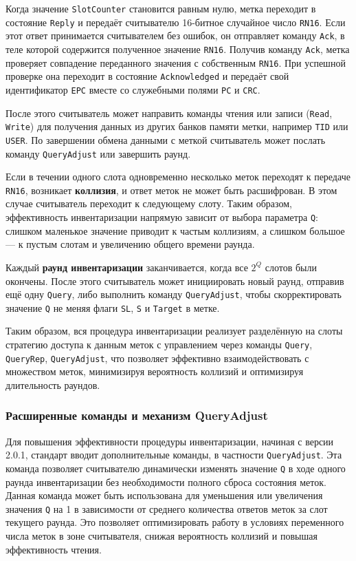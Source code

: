 \documentclass[12pt]{article}
\theoremstyle{definition}
\begin{document}
Когда значение \texttt{SlotCounter} становится равным нулю, метка переходит в состояние \texttt{Reply} и передаёт считывателю 16-битное случайное число \texttt{RN16}. Если этот ответ принимается считывателем без ошибок, он отправляет команду \texttt{Ack}, в теле которой содержится полученное значение \texttt{RN16}. Получив команду \texttt{Ack}, метка проверяет совпадение переданного значения с собственным \texttt{RN16}. При успешной проверке она переходит в состояние \texttt{Acknowledged} и передаёт свой идентификатор \texttt{EPC} вместе со служебными полями \texttt{PC} и \texttt{CRC}.

После этого считыватель может направить команды чтения или записи (\texttt{Read}, \texttt{Write}) для получения данных из других банков памяти метки, например \texttt{TID} или \texttt{USER}. По завершении обмена данными с меткой считыватель может послать команду \texttt{QueryAdjust} или завершить раунд.

Если в течении одного слота одновременно несколько меток переходят к передаче \texttt{RN16}, возникает \textbf{коллизия}, и ответ меток не может быть расшифрован. В этом случае считыватель переходит к следующему слоту. Таким образом, эффективность инвентаризации напрямую зависит от выбора параметра \texttt{Q}: слишком маленькое значение приводит к частым коллизиям, а слишком большое --- к пустым слотам и увеличению общего времени раунда.

Каждый \textbf{раунд инвентаризации} заканчивается, когда все $2^Q$ слотов были окончены. После этого считыватель может инициировать новый раунд, отправив ещё одну \texttt{Query}, либо выполнить команду \texttt{QueryAdjust}, чтобы скорректировать значение \texttt{Q} не меняя флаги \texttt{SL}, \texttt{S} и \texttt{Target} в метке.

Таким образом, вся процедура инвентаризации реализует разделённую на слоты стратегию доступа к данным меток с управлением через команды \texttt{Query}, \texttt{QueryRep}, \texttt{QueryAdjust}, что позволяет эффективно взаимодействовать с множеством меток, минимизируя вероятность коллизий и оптимизируя длительность раундов.

\subsubsection{Расширенные команды и механизм QueryAdjust}

Для повышения эффективности процедуры инвентаризации, начиная с версии 2.0.1, стандарт вводит дополнительные команды, в частности \texttt{QueryAdjust}. Эта команда позволяет считывателю динамически изменять значение \texttt{Q} в ходе одного раунда инвентаризации без необходимости полного сброса состояния меток. Данная команда может быть использована для уменьшения или увеличения значения \texttt{Q} на 1 в зависимости от среднего количества ответов меток за слот текущего раунда. Это позволяет оптимизировать работу в условиях переменного числа меток в зоне считывателя, снижая вероятность коллизий и повышая эффективность чтения.
\end{document}

